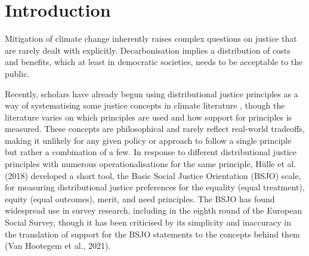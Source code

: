 \documentclass[10pt,letterpaper]{article}
\begin{document}
\vspace{1cm}
\section*{Introduction}
\normalsize
Mitigation of climate change inherently raises complex questions on justice that are rarely dealt with explicitly. Decarbonisation implies a distribution of costs and benefits, which at least in democratic societies, needs to be acceptable to the public. %



Recently, scholars have already begun using distributional justice principles as a way of systematising some justice concepts in climate literature \autocite{devries2024, torne2024, heyen2023, jafino2021}, though the literature varies on which principles are used and how support for principles is measured. These concepts are philosophical and rarely reflect real-world tradeoffs, making it unlikely for any given policy or approach to follow a single principle but rather a combination of a few. In response to different distributional justice principles with numerous operationalisations for the same principle, Hülle et al. (2018) developed a short tool, the Basic Social Justice Orientation (BSJO) scale, for measuring distributional justice preferences for the equality (equal treatment), equity (equal outcomes), merit, and need principles. The BSJO has found widespread use in survey research, including in the eighth round of the European Social Survey, though it has been criticised by its simplicity and inaccuracy in the translation of support for the BSJO statements to the concepts behind them (Van Hootegem et al., 2021).  
\end{document}
